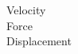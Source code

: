 \documentclass[preview]{standalone}
\begin{document}
Velocity\\Force\\Displacement\\
\end{document}
